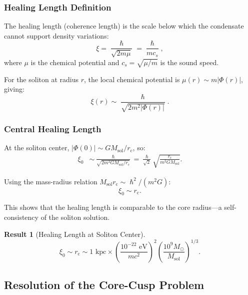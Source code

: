 \documentclass[11pt,a4paper]{article}
\newcommand{\hbar}{\ensuremath{\hslash}}
\newcommand{\Msun}{\ensuremath{M_{\odot}}}
\newcommand{\Msol}{\ensuremath{M_{\mathrm{sol}}}}
\newcommand{\rc}{\ensuremath{r_{\mathrm{c}}}}
\theoremstyle{definition}
\newtheorem{result}{Result}
\theoremstyle{remark}
\begin{document}
\subsubsection{Healing Length Definition}

The healing length (coherence length) is the scale below which the condensate cannot support density variations:
\begin{equation}
\label{eq:healing_length}
\xi = \frac{\hbar}{\sqrt{2m \mu}} = \frac{\hbar}{mc_s},
\end{equation}
where $\mu$ is the chemical potential and $c_s = \sqrt{\mu/m}$ is the sound speed.

For the soliton at radius $r$, the local chemical potential is $\mu(r) \sim m|\Phi(r)|$, giving:
\begin{equation}
\xi(r) \sim \frac{\hbar}{\sqrt{2m^2 |\Phi(r)|}}.
\end{equation}

\subsubsection{Central Healing Length}

At the soliton center, $|\Phi(0)| \sim G\Msol/\rc$, so:
\begin{align}
\xi_0 &\sim \frac{\hbar}{\sqrt{2m^2 G\Msol/\rc}} = \frac{\hbar}{\sqrt{2}} \sqrt{\frac{\rc}{m^2 G\Msol}}.
\end{align}

Using the mass-radius relation $\Msol\rc \sim \hbar^2/(m^2 G)$:
\begin{equation}
\xi_0 \sim \rc.
\end{equation}

This shows that the healing length is comparable to the core radius---a self-consistency of the soliton solution.

\begin{result}[Healing Length at Soliton Center]
\begin{equation}
\boxed{\xi_0 \sim \rc \sim 1 \text{ kpc} \times \left(\frac{10^{-22}\text{ eV}}{mc^2}\right)^2 \left(\frac{10^9\Msun}{\Msol}\right)^{1/3}.}
\end{equation}
\end{result}

\subsection{Resolution of the Core-Cusp Problem}
\label{sec:core_cusp}
\end{document}

